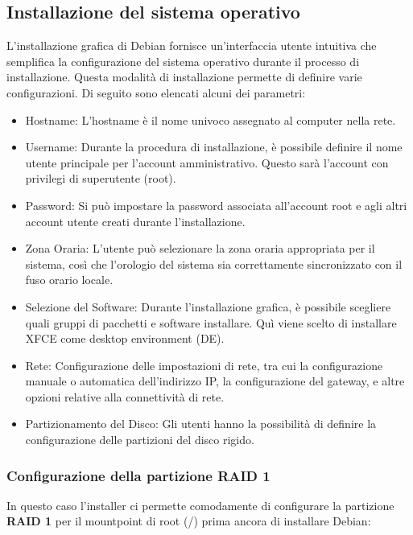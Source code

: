 \documentclass[11pt]{article}
\begin{document}
\subsection{Installazione del sistema operativo}
L'installazione grafica di Debian fornisce un'interfaccia utente intuitiva che semplifica la configurazione del sistema operativo durante il processo di installazione. Questa modalità di installazione permette di definire varie configurazioni. Di seguito sono elencati alcuni dei parametri:
\begin{itemize}
    \item Hostname: L'hostname è il nome univoco assegnato al computer nella rete.
    \item Username: Durante la procedura di installazione, è possibile definire il nome utente principale per l'account amministrativo. Questo sarà l'account con privilegi di superutente (root).
    \item Password: Si può impostare la password associata all'account root e agli altri account utente creati durante l'installazione.
    \item Zona Oraria: L'utente può selezionare la zona oraria appropriata per il sistema, così che l'orologio del sistema sia correttamente sincronizzato con il fuso orario locale.
    \item Selezione del Software: Durante l'installazione grafica, è possibile scegliere quali gruppi di pacchetti e software installare. Quì viene scelto di installare XFCE come desktop environment (DE).
    \item Rete: Configurazione delle impostazioni di rete, tra cui la configurazione manuale o automatica dell'indirizzo IP, la configurazione del gateway, e altre opzioni relative alla connettività di rete.
    \item Partizionamento del Disco: Gli utenti hanno la possibilità di definire la configurazione delle partizioni del disco rigido.
\end{itemize}

\subsubsection{Configurazione della partizione RAID 1}
In questo caso l'installer ci permette comodamente di configurare la partizione \textbf{RAID 1} per il mountpoint di root (/) prima ancora di installare Debian:
\end{document}
